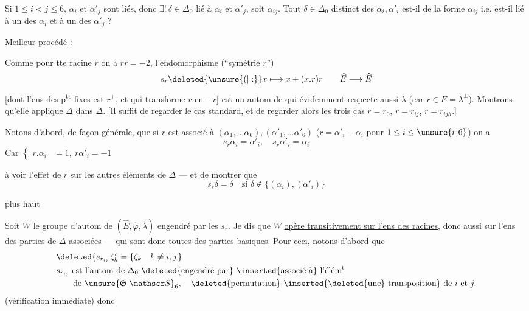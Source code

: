 Si $1\le i<j\le6$, \deleted{$\unsure{\delta}$}$\alpha_i$ et $\alpha'_j$ sont liés, donc $\exists!\ \delta\in\Delta_0$ lié à $\alpha_i$ et $\alpha'_j$, soit $\alpha_{ij}$.  Tout $\delta\in\Delta_0$ distinct des $\alpha_i,\alpha'_i$ est-il de la forme $\alpha_{ij}$ i.e. est-il lié à un des $\alpha_i$ et à un des $\alpha'_j$ ? 

 Meilleur procédé :

Comme pour tte racine $r$ on a $rr=-2$, l'endomorphisme (``symétrie  $r$'')
\[
s_r\deleted{\unsure{(|:}}x\longmapsto x+(x.r)r\qquad\widehat E\longrightarrow\widehat E
\]
[dont l'ens des p\textsuperscript{ts} fixes est $r^\perp$, et qui transforme $r$ en $-r$] est un autom de   qui évidemment respecte aussi $\lambda$ (car $r\in E=\lambda^\perp$). Montrons qu'elle applique $\Delta$ dans $\Delta$. [Il suffit de regarder le cas standard, et de regarder alors les trois cas $r=r_0$, $r=r_{ij}$, $r=r_{ijh}$.]

 Notons d'abord, de façon générale, que si $r$ est associé à $(\alpha_1,\ldots\alpha_6),(\alpha'_1,\ldots\alpha'_6)$ ($r=\alpha'_i-\alpha_i$ pour $1\le i\le\unsure{r|6}$) on a
\[
\boxed{s_r\alpha_i=\alpha'_i,\quad s_r\alpha'_i=\alpha_i}
\]
Car $\left\{\begin{aligned}r.\alpha_i&=1,\ r\alpha'_i=-1\end{aligned}\right.$

 à voir l'effet de $r$ sur les autres éléments de $\Delta$ --- et de montrer que
\[
\boxed{s_r\delta=\delta\quad\text{si }\delta\notin\{(\alpha_i),(\alpha'_i)\}}
\]

 plus haut



Soit $W$ le groupe d'autom de $(\widehat E,\widehat\varphi,\lambda)$  engendré par les $s_r$. Je dis que $W$ \uline{opère transitivement sur l'ens des racines}, donc aussi sur l'ens des parties  de $\Delta$ associées --- qui sont donc toutes des parties basiques. Pour ceci, notons d'abord que
\[
\begin{aligned}
&\deleted{s_{r_{ij}}\,\zeta'_k=\left\{\zeta_k\quad k\ne i,j\right.}\\
&s_{r_{ij}}\text{ est l'autom de }\Delta_0\ \deleted{\text{engendré par}}\ \inserted{\text{associé à}}\ \text{l'élém}^{\rm t}\\
&\qquad\text{de }\unsure{\mathfrak S|\mathscr S}_6,\quad\deleted{\text{permutation}}\ \inserted{\deleted{\text{une}}\ \text{transposition}}\ \text{de }i\text{ et }j.
\end{aligned}
\]
(vérification immédiate) donc

